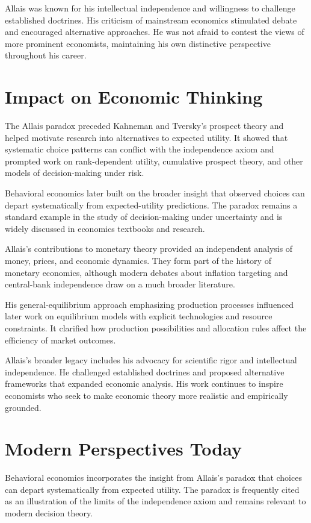 Allais was known for his intellectual independence and willingness to
challenge established doctrines. His criticism of mainstream economics
stimulated debate and encouraged alternative approaches. He was not afraid
to contest the views of more prominent economists, maintaining his own
distinctive perspective throughout his career.

\section{Impact on Economic Thinking}
The Allais paradox preceded Kahneman and Tversky's prospect theory and helped
motivate research into alternatives to expected utility. It showed that
systematic choice patterns can conflict with the independence axiom and
prompted work on rank-dependent utility, cumulative prospect theory, and
other models of decision-making under risk.

Behavioral economics later built on the broader insight that observed choices
can depart systematically from expected-utility predictions. The paradox
remains a standard example in the study of decision-making under uncertainty
and is widely discussed in economics textbooks and research.

Allais's contributions to monetary theory provided an independent analysis of
money, prices, and economic dynamics. They form part of the history of
monetary economics, although modern debates about inflation targeting and
central-bank independence draw on a much broader literature.

His general-equilibrium approach emphasizing production processes influenced
later work on equilibrium models with explicit technologies and resource
constraints. It clarified how production possibilities and allocation rules
affect the efficiency of market outcomes.

Allais's broader legacy includes his advocacy for scientific rigor and intellectual
independence. He challenged established doctrines and proposed alternative
frameworks that expanded economic analysis. His work continues to inspire
economists who seek to make economic theory more realistic and empirically
grounded.

\section{Modern Perspectives Today}
Behavioral economics incorporates the insight from Allais's paradox that
choices can depart systematically from expected utility. The paradox is
frequently cited as an illustration of the limits of the independence axiom
and remains relevant to modern decision theory.


